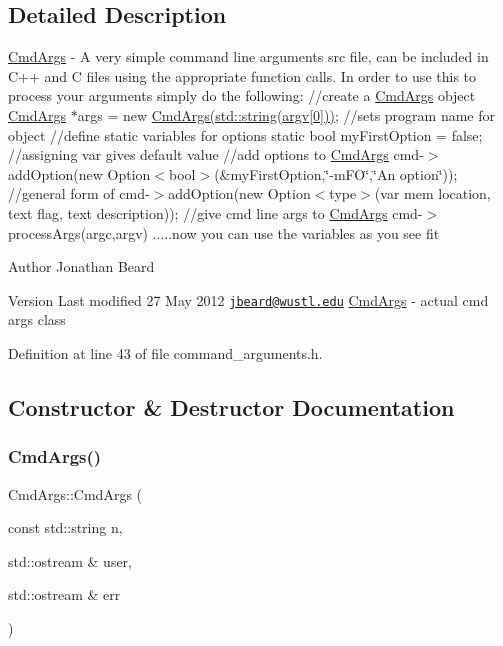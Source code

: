 \subsection{Detailed Description}
\hyperlink{class_cmd_args}{Cmd\+Args} -\/ A very simple command line arguments src file, can be included in C++ and C files using the appropriate function calls. In order to use this to process your arguments simply do the following\+: //create a \hyperlink{class_cmd_args}{Cmd\+Args} object \hyperlink{class_cmd_args}{Cmd\+Args} $\ast$args = new \hyperlink{class_cmd_args}{Cmd\+Args(std\+::string(argv\mbox{[}0\mbox{]}))}; //sets program name for object //define static variables for options static bool my\+First\+Option = false; //assigning var gives default value //add options to \hyperlink{class_cmd_args}{Cmd\+Args} cmd-\/$>$add\+Option(new Option$<$bool$>$(\&my\+First\+Option,\char`\"{}-\/m\+F\+O\char`\"{},\char`\"{}\+An option\char`\"{})); //general form of cmd-\/$>$add\+Option(new Option$<$type$>$(var mem location, text flag, text description)); //give cmd line args to \hyperlink{class_cmd_args}{Cmd\+Args} cmd-\/$>$process\+Args(argc,argv) .....now you can use the variables as you see fit

\begin{DoxyAuthor}{Author}
Jonathan Beard 
\end{DoxyAuthor}
\begin{DoxyVersion}{Version}
Last modified 27 May 2012  \href{mailto:jbeard@wustl.edu}{\tt jbeard@wustl.\+edu} \hyperlink{class_cmd_args}{Cmd\+Args} -\/ actual cmd args class 
\end{DoxyVersion}


Definition at line 43 of file command\+\_\+arguments.\+h.



\subsection{Constructor \& Destructor Documentation}
\hypertarget{class_cmd_args_a214efd9198eb8124a08e80cda9f0e253}{}\label{class_cmd_args_a214efd9198eb8124a08e80cda9f0e253} 
\subsubsection{\texorpdfstring{Cmd\+Args()}{CmdArgs()}}
{\footnotesize\ttfamily Cmd\+Args\+::\+Cmd\+Args (\begin{DoxyParamCaption}\item[{const std\+::string}]{n,  }\item[{std\+::ostream \&}]{user,  }\item[{std\+::ostream \&}]{err }\end{DoxyParamCaption})}

